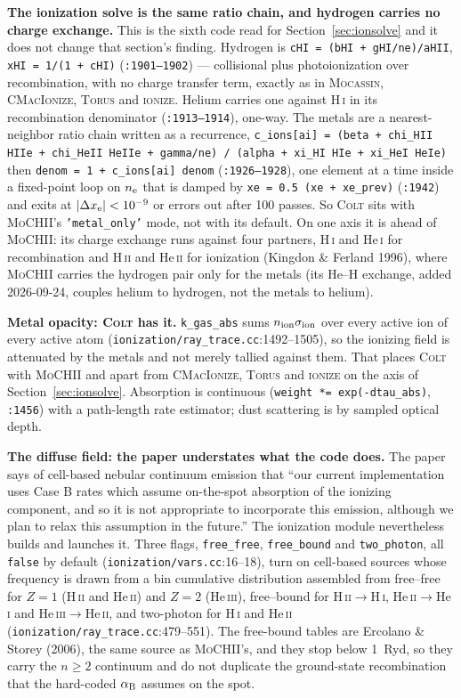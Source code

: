 \documentclass[english,a4paper]{my_memo}
\newcommand{\code}[1]{\texttt{#1}}
\newcommand{\MoCHII}{\textsc{MoCHII}}
\newcommand{\Wood}{\textsc{ionize}}
\newcommand{\CMI}{\textsc{CMacIonize}}
\newcommand{\Torus}{\textsc{Torus}}
\newcommand{\Mocassin}{\textsc{Mocassin}}
\newcommand{\Colt}{\textsc{Colt}}
\newcommand{\HII}{H\,\textsc{ii}}
\newcommand{\HI}{H\,\textsc{i}}
\newcommand{\HeI}{He\,\textsc{i}}
\newcommand{\HeII}{He\,\textsc{ii}}
\newcommand{\HeIII}{He\,\textsc{iii}}
\newcommand{\nelec}{n_{\rm e}}
\begin{document}
\textbf{The ionization solve is the same ratio chain, and hydrogen carries
no charge exchange.}  This is the sixth code read for
Section~\ref{sec:ionsolve} and it does not change that section's finding.
Hydrogen is \code{cHI = (bHI + gHI/ne)/aHII}, \code{xHI = 1/(1 + cHI)}
(\code{:1901--1902}) --- collisional plus photoionization over
recombination, with no charge transfer term, exactly as in \Mocassin{},
\CMI{}, \Torus{} and \Wood{}.  Helium carries one against \HI{} in its
recombination denominator (\code{:1913--1914}), one-way.  The metals are a
nearest-neighbor ratio chain written as a recurrence,
\code{c\_ions[ai] = (beta + chi\_HII\,HIIe + chi\_HeII\,HeIIe + gamma/ne) /
(alpha + xi\_HI\,HIe + xi\_HeI\,HeIe)} then
\code{denom = 1 + c\_ions[ai]\,denom} (\code{:1926--1928}), one element at a
time inside a fixed-point loop on $\nelec$ that is damped by
\code{xe = 0.5\,(xe + xe\_prev)} (\code{:1942}) and exits at
$|\Delta x_{\rm e}| < 10^{-9}$ or errors out after 100 passes.  So
\Colt{} sits with \MoCHII{}'s \code{'metal\_only'} mode, not with its
default.  On one axis it is ahead of \MoCHII{}: its charge exchange runs
against four partners, \HI{} and \HeI{} for recombination and \HII{} and
\HeII{} for ionization (Kingdon \& Ferland 1996), where \MoCHII{} carries
the hydrogen pair only for the metals (its He--H exchange, added
2026-09-24, couples helium to hydrogen, not the metals to helium).

\textbf{Metal opacity: \Colt{} has it.}  \code{k\_gas\_abs} sums
$n_{\rm ion}\sigma_{\rm ion}$ over every active ion of every active atom
(\code{ionization/\allowbreak ray\_\allowbreak trace.cc}:1492--1505), so the ionizing field is
attenuated by the metals and not merely tallied against them.  That places
\Colt{} with \MoCHII{} and apart from \CMI{}, \Torus{} and \Wood{} on the
axis of Section~\ref{sec:ionsolve}.  Absorption is continuous
(\code{weight *= exp(-dtau\_abs)}, \code{:1456}) with a path-length rate
estimator; dust scattering is by sampled optical depth.

\textbf{The diffuse field: the paper understates what the code does.}  The
paper says of cell-based nebular continuum emission that ``our current
implementation uses Case B rates which assume on-the-spot absorption of
the ionizing component, and so it is not appropriate to incorporate this
emission, although we plan to relax this assumption in the future.''  The
ionization module nevertheless builds and launches it.  Three flags,
\code{free\_free}, \code{free\_bound} and \code{two\_photon}, all
\code{false} by default (\code{ionization/vars.cc}:16--18), turn on
cell-based sources whose frequency is drawn from a bin cumulative
distribution assembled from free--free for $Z=1$ (\HII{} and \HeII{}) and
$Z=2$ (\HeIII{}), free--bound for
\HII{}$\rightarrow$\HI{}, \HeII{}$\rightarrow$\HeI{} and
\HeIII{}$\rightarrow$\HeII{}, and two-photon for \HI{} and \HeII{}
(\code{ionization/\allowbreak ray\_\allowbreak trace.cc}:479--551).  The free-bound tables are
Ercolano \& Storey (2006), the same source as \MoCHII{}'s, and they stop
below 1~Ryd, so they carry the $n \ge 2$ continuum and do not duplicate
the ground-state recombination that the hard-coded $\alpha_{\rm B}$
assumes on the spot.
\end{document}
